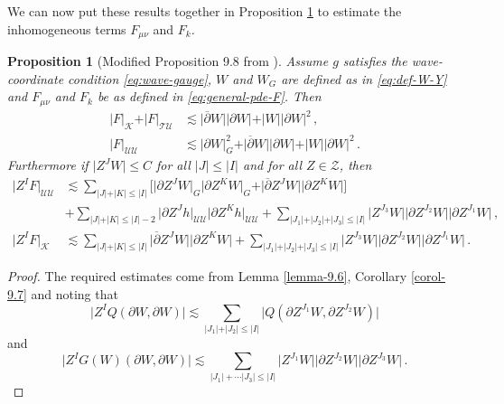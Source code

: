 \documentclass[11pt, a4paper]{amsart}
\numberwithin{equation}{section}
\newtheorem{proposition}[theorem]{Proposition}
\numberwithin{theorem}{section}
\newcommand{\p}{\partial}
\newcommand{\mn}{{\mu \nu}}
\newcommand{\pgood}{\overline{\partial}}
\newcommand{\UU}{{\mathcal{U} \mathcal{U}}}
\newcommand{\TU}{{\mathcal{T} \mathcal{U}}}
\newcommand{\K}{\mathcal{K}}
\newcommand{\I}{\vert I \vert}
\begin{document}
We can now put these results together in Proposition \ref{prop-9.8} to estimate the inhomogeneous terms $F_\mn$ and $F_k$. 
\begin{proposition}[Modified Proposition 9.8 from \cite{LR:04}] \label{prop-9.8}
Assume $g$ satisfies the wave-coordinate condition \eqref{eq:wave-gauge},  $W$ and $W_G$ are defined as in \eqref{eq:def-W-Y} and $F_\mn$ and $F_k$ be as defined in \eqref{eq:general-pde-F}. Then
\begin{equation} \begin{split}
\vert F \vert_\K + \vert F \vert_\TU  &\lesssim \vert \pgood W \vert \vert \p W \vert + \vert W \vert \vert \p W \vert^2 \,, \\
\vert F \vert_\UU & \lesssim \vert \p W \vert_G^2 + \vert \pgood W \vert \vert \p W \vert + \vert W \vert \vert \p W \vert^2  \,. \end{split} \label{eq:prop9.8-estimates}
\end{equation}
Furthermore if $\vert Z^J W \vert \leq C$ for all $\vert J \vert \leq \vert I \vert $ and for all $Z \in \mathcal{Z}$, then 
\begin{align*}
\vert Z^I F \vert_\UU & \lesssim  \sum_{\vert J \vert + \vert K \vert \leq \vert I \vert} \Big[ \vert \p Z^J W \vert_G \vert \p Z^K W \vert_G  + \vert \pgood Z^J W \vert \vert \p Z^K W \vert \Big] \\
&  + \sum_{\vert J \vert + \vert K \vert \leq \vert I \vert-2 } \vert \p Z^{J} h \vert_\UU \vert \p Z^K h \vert_\UU + \sum_{\vert J_1 \vert +\vert J_2 \vert + \vert J_3 \vert \leq \vert I \vert} \vert Z^{J_3} W \vert \vert \p Z^{J_2} W \vert \vert \p Z^{J_1} W \vert \,, \\
\vert Z^I F \vert_\K & \lesssim \sum_{\vert J \vert + \vert K \vert \leq \vert I \vert} \vert \pgood Z^J W \vert \vert \p Z^K W \vert + \sum_{\vert J_1 \vert +\vert J_2 \vert + \vert J_3 \vert \leq \vert I \vert} \vert Z^{J_3} W \vert \vert \p Z^{J_2} W \vert \vert \p Z^{J_1} W \vert \,.
\end{align*}
\end{proposition}
\begin{proof}
The required estimates come from Lemma \ref{lemma-9.6}, Corollary \ref{corol-9.7} and noting that
$$ \vert Z^I Q (\p W, \p W) \vert \lesssim \sum_{| J_1| + \vert J_2 \vert \leq \I} \vert Q ( \p Z^{J_1} W, \p Z^{J_2} W) \vert $$
and
$$ \vert Z^I G (W)(\p W, \p W) \vert \lesssim \sum_{| J_1| + \cdots| J_3| \leq \I} \vert Z^{J_1} W \vert \vert \p Z^{J_2} W \vert \vert \p Z^{J_3} W \vert \,.$$
\end{proof}
\end{document}
